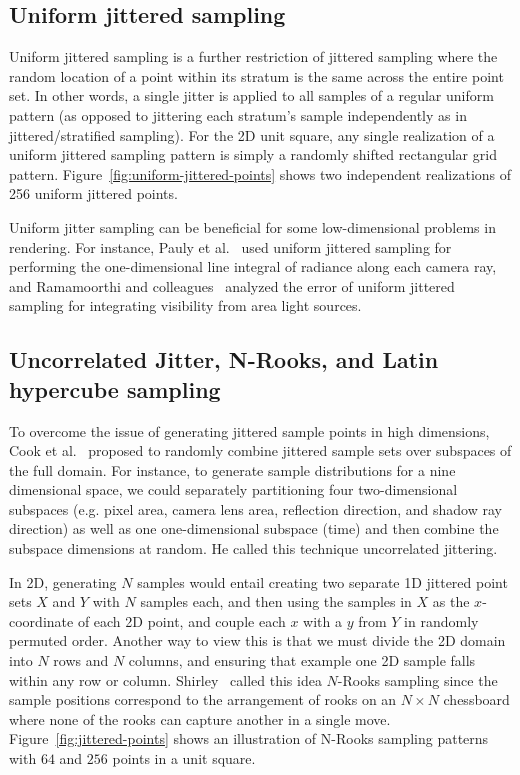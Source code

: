 \documentclass[11pt,fleqn]{book} %
\begin{document}
%

%

\subsection{Uniform jittered sampling}
Uniform jittered sampling is a further restriction of jittered sampling where the random location of a point within its stratum is the same across the entire point set. In other words, a single jitter is applied to all samples of a regular uniform pattern (as opposed to jittering each stratum's sample independently as in jittered/stratified sampling). For the 2D unit square, any single realization of a uniform jittered sampling pattern is simply a randomly shifted rectangular grid pattern. Figure~\ref{fig:uniform-jittered-points} shows two independent realizations of 256 uniform jittered points.

Uniform jitter sampling can be beneficial for some low-dimensional problems in rendering. For instance, Pauly et al.~\cite{pauly00metropolis} used uniform jittered sampling for performing the one-dimensional line integral of radiance along each camera ray, and Ramamoorthi and colleagues~\cite{Ramamoorthi:2012} analyzed the error of uniform jittered sampling for integrating visibility from area light sources.



\subsection{Uncorrelated Jitter, N-Rooks, and Latin hypercube sampling}
To overcome the issue of generating jittered sample points in high dimensions, Cook et al.~\cite{Cook:1984:DRT} proposed to randomly combine jittered sample sets over subspaces of the full domain. For instance, to generate sample distributions for a nine dimensional space, we could separately partitioning four two-dimensional subspaces (e.g. pixel area, camera lens area, reflection direction, and shadow ray direction) as well as one one-dimensional subspace (time) and then combine the subspace dimensions at random. He called this technique uncorrelated jittering.

In 2D, generating $N$ samples would entail creating two separate 1D jittered point sets $X$ and $Y$ with $N$ samples each, and then using the samples in $X$ as the $x$-coordinate of each 2D point, and couple each $x$ with a $y$ from $Y$ in randomly permuted order. Another way to view this is that we must divide the 2D domain into $N$ rows and $N$ columns, and ensuring that example one 2D sample falls within any row or column. Shirley~\cite{Shirley91-DQMSD} called this idea $N$-Rooks sampling since the sample positions correspond to the arrangement of rooks on an $N\times N$ chessboard where none of the rooks can capture another in a single move. Figure~\ref{fig:jittered-points} shows an illustration of N-Rooks sampling patterns with $64$ and $256$ points in a unit square.
\end{document}
